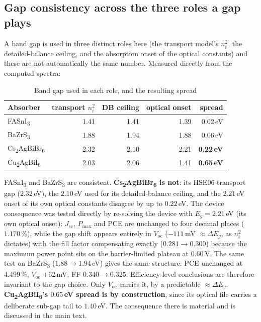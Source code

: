 \documentclass[lettersize,journal,onecolumn]{IEEEtran}
\newcommand{\FASnI}{FASnI\textsubscript{3}}
\newcommand{\CABI}{Cu\textsubscript{2}AgBiI\textsubscript{6}}
\newcommand{\BZS}{BaZrS\textsubscript{3}}
\newcommand{\CABB}{Cs\textsubscript{2}AgBiBr\textsubscript{6}}
\begin{document}
\subsection{Gap consistency across the three roles a gap plays}
A band gap is used in three distinct roles here (the transport model's
$n_i^2$, the detailed-balance ceiling, and the absorption onset of the optical
constants) and these are not automatically the same number. Measured directly
from the computed spectra:

\begin{table}[!ht]
\caption{Band gap used in each role, and the resulting spread}
\centering\small
\begin{tabular}{lrrrr}
\toprule
Absorber & transport $n_i^2$ & DB ceiling & optical onset & spread \\
\midrule
\FASnI & 1.41 & 1.41 & 1.39 & 0.02\,eV \\
\BZS   & 1.88 & 1.94 & 1.88 & 0.06\,eV \\
\CABB  & 2.32 & 2.10 & 2.21 & \textbf{0.22\,eV} \\
\CABI  & 2.03 & 2.06 & 1.41 & \textbf{0.65\,eV} \\
\bottomrule
\end{tabular}
\end{table}

\FASnI{} and \BZS{} are consistent. \textbf{\CABB{} is not}: its HSE06
transport gap ($2.32\,$eV), the $2.10\,$eV used for its detailed-balance
ceiling, and the $2.21\,$eV onset of its own optical constants disagree by up
to $0.22\,$eV. The device consequence was tested directly by re-solving the device with
$E_g = 2.21\,$eV (its own optical onset): $J_\mathrm{sc}$, $P_\mathrm{max}$
and PCE are unchanged to four decimal places ($1.170\,\%$), while the gap
shift appears entirely in $V_\mathrm{oc}$ ($-111\,$mV $\approx \Delta E_g$,
as $n_i^2$ dictates) with the fill factor compensating exactly
($0.281\rightarrow0.300$) because the maximum power point sits on the
barrier-limited plateau at $0.60\,$V. The same test on \BZS{}
($1.88\rightarrow1.94\,$eV) gives the same structure: PCE unchanged at
$4.499\,\%$, $V_\mathrm{oc}$ $+62\,$mV, FF $0.340\rightarrow0.325$.
Efficiency-level conclusions are therefore invariant to the gap choice.
Only $V_\mathrm{oc}$ carries it, by a predictable ${\approx}\Delta E_g$. \textbf{\CABI's $0.65\,$eV spread is by construction}, since its
optical file carries a deliberate sub-gap tail to $1.40\,$eV. The consequence
there is material and is discussed in the main text.
\end{document}
